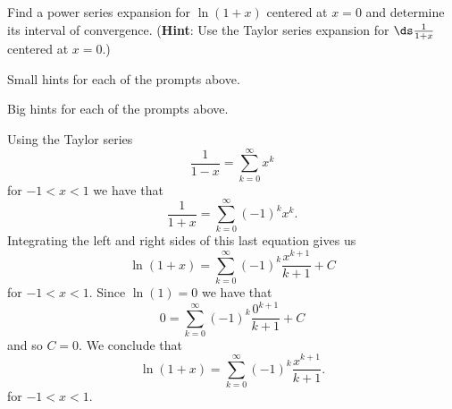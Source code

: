 \begin{activity} \label{8.6.Act4}
Find a power series expansion for $\ln(1+x)$ centered at $x=0$ and determine its interval of convergence. ({\bf Hint}: Use the Taylor series expansion for $\ds \frac{1}{1+x}$ centered at $x=0$.)



\end{activity}

\begin{smallhint}
\ba
	\item Small hints for each of the prompts above.
\ea
\end{smallhint}
\begin{bighint}
\ba
	\item Big hints for each of the prompts above.
\ea
\end{bighint}
\begin{activitySolution}
 Using the Taylor series
    \[\frac{1}{1-x} = \sum_{k=0}^{\infty} x^k\]
    for $-1 < x < 1$ we have that 
    \[\frac{1}{1+x} = \sum_{k=0}^{\infty} (-1)^k x^k.\] 
    Integrating the left and right sides of this last equation gives us 
    \[\ln(1+x) = \sum_{k=0}^{\infty} (-1)^k \frac{x^{k+1}}{k+1} + C\]
    for $-1 < x < 1$. Since $\ln(1) = 0$ we have that 
    \[0 = \sum_{k=0}^{\infty} (-1)^k \frac{0^{k+1}}{k+1} + C\]
    and so $C = 0$. We conclude that 
    \[\ln(1+x) = \sum_{k=0}^{\infty} (-1)^k \frac{x^{k+1}}{k+1}.\]
    for $-1 < x < 1$. 
    
\end{activitySolution}
\aftera